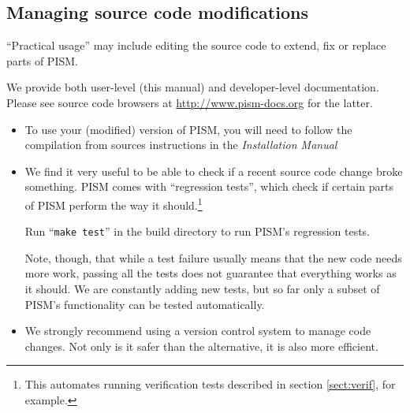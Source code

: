 \subsection{Managing source code modifications}
\label{sec:code-modifications}

``Practical usage'' may include editing the source code to extend, fix
or replace parts of PISM.

We provide both user-level (this manual) and developer-level documentation.
Please see source code browsers at \url{http://www.pism-docs.org} for the latter.

\begin{itemize}
\item To use your (modified) version of PISM, you will need to follow the
  compilation from sources instructions in the \emph{Installation Manual}
\item We find it very useful to be able to check if a recent source code change
  broke something. PISM comes with ``regression tests'', which check if certain
  parts of PISM perform the way it should.\footnote{This automates running
    verification tests described in section \ref{sect:verif}, for example.}

  Run ``\texttt{make test}'' in the build directory to run PISM's regression tests.

  Note, though, that while a test failure usually means that the new code needs
  more work, passing all the tests does not guarantee that everything works as
  it should. We are constantly adding new tests, but so far only a subset
  of PISM's functionality can be tested automatically.
\item We strongly recommend using a version control system to manage code
  changes. Not only is it safer than the alternative, it is also more efficient.
\end{itemize}


